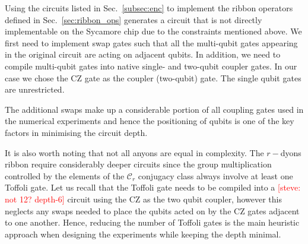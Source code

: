 \documentclass[two column]{article}
\newcommand{\caro}[1]{\textcolor{red}{[#1]}}
\begin{document}
Using the circuits listed in Sec.~\ref{subsec:enc} to implement the ribbon operators defined in Sec.~\ref{sec:ribbon_ops} generates a circuit that is not directly implementable on the Sycamore chip due to the constraints mentioned above. We first need to implement swap gates such that all the multi-qubit gates appearing in the original circuit are acting on adjacent qubits. In addition, we need to compile multi-qubit gates into native single- and two-qubit coupler gates. In our case we chose the CZ gate as the coupler (two-qubit) gate. The single qubit gates are unrestricted.  

The additional swaps make up a considerable portion of all coupling gates used in the numerical experiments and hence the positioning of qubits is one of the key factors in minimising the circuit depth.

It is also worth noting that not all anyons are equal in complexity. The $r-$dyons ribbon require considerably deeper circuits since the group multiplication controlled by the elements of the $\mathcal{C}_r$ conjugacy class always involve at least one Toffoli gate. Let us recall that the Toffoli gate needs to be compiled into a \caro{steve: not 12? depth-6} circuit using the CZ as the two qubit coupler, however this neglects any swaps needed to place the qubits acted on by the CZ gates adjacent to one another. Hence, reducing the number of Toffoli gates is the main heuristic approach when designing the experiments while keeping the depth minimal.
\end{document}
